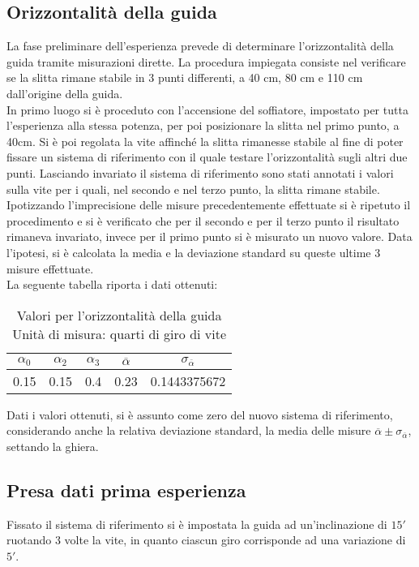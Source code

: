 \documentclass[a4paper,11pt,oneside]{article}
\begin{document}
\subsection{Orizzontalità della guida}
La fase preliminare dell'esperienza prevede di determinare l'orizzontalità della guida tramite misurazioni dirette. La procedura impiegata consiste nel verificare se la slitta rimane stabile in 3 punti differenti, a 40 cm, 80 cm e 110 cm dall'origine della guida.\\
In primo luogo si è proceduto con l'accensione del soffiatore, impostato per tutta l'esperienza alla stessa potenza, per poi posizionare la slitta nel primo punto, a 40cm. Si è poi regolata la vite affinché la slitta rimanesse stabile al fine di poter fissare un sistema di riferimento con il quale testare l'orizzontalità sugli altri due punti. Lasciando invariato il sistema di riferimento sono stati annotati i valori sulla vite per i quali, nel secondo  e nel terzo punto, la slitta rimane stabile.\\
Ipotizzando l'imprecisione delle misure precedentemente effettuate si è ripetuto il procedimento e si è verificato che per il secondo e per il terzo punto il risultato rimaneva invariato, invece per il primo punto si è misurato un nuovo valore. Data l'ipotesi, si è calcolata la media e la deviazione standard su queste ultime 3 misure effettuate.\\
La seguente tabella riporta i dati ottenuti:

\begin{table}[h]
    \centering
        \caption{Valori per l'orizzontalità della guida \\ Unità di misura: quarti di giro di vite}
\begin{tabular}{ccc|cc}
    \toprule
    $\alpha_{0}$&$\alpha_{2}$&$\alpha_{3}$&$\overline{\alpha}$&$\sigma_{\overline{\alpha}}$\\
    \midrule
0.15&0.15&0.4&0.23&0.1443375672 \\
    \bottomrule
    \end{tabular}
    \label{tab:guida_orizzontale}
\end{table}

Dati i valori ottenuti, si è assunto come zero del nuovo sistema di riferimento, considerando anche la relativa deviazione standard, la media delle misure $\overline{\alpha} \pm \sigma_{\overline{\alpha}}$, settando la ghiera.\\


\subsection{Presa dati prima esperienza}
Fissato il sistema di riferimento si è impostata la guida ad un'inclinazione di $15'$ ruotando 3 volte la vite, in quanto ciascun giro corrisponde ad una variazione  di $5'$.\\
\end{document}
